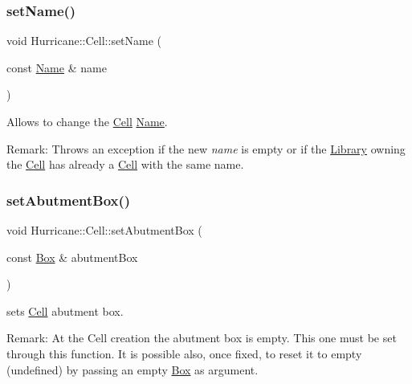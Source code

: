 \subsubsection{\texorpdfstring{set\+Name()}{setName()}}
{\footnotesize\ttfamily void Hurricane\+::\+Cell\+::set\+Name (\begin{DoxyParamCaption}\item[{const \mbox{\hyperlink{classHurricane_1_1Name}{Name}} \&}]{name }\end{DoxyParamCaption})}

Allows to change the \mbox{\hyperlink{classHurricane_1_1Cell}{Cell}} \mbox{\hyperlink{classHurricane_1_1Name}{Name}}.

\begin{DoxyParagraph}{Remark\+: Throws an exception if the new {\itshape name} is empty or if the}
\mbox{\hyperlink{classHurricane_1_1Library}{Library}} owning the \mbox{\hyperlink{classHurricane_1_1Cell}{Cell}} has already a \mbox{\hyperlink{classHurricane_1_1Cell}{Cell}} with the same name. 
\end{DoxyParagraph}
\mbox{\label{classHurricane_1_1Cell_ab1949e2b708f0bd2d215ab90cfe864e0}} 
\subsubsection{\texorpdfstring{set\+Abutment\+Box()}{setAbutmentBox()}}
{\footnotesize\ttfamily void Hurricane\+::\+Cell\+::set\+Abutment\+Box (\begin{DoxyParamCaption}\item[{const \mbox{\hyperlink{classHurricane_1_1Box}{Box}} \&}]{abutment\+Box }\end{DoxyParamCaption})}

sets \mbox{\hyperlink{classHurricane_1_1Cell}{Cell}} abutment box.

\begin{DoxyParagraph}{Remark\+: At the Cell creation the abutment box is empty. This one must}
be set through this function. It is possible also, once fixed, to reset it to empty (undefined) by passing an empty \mbox{\hyperlink{classHurricane_1_1Box}{Box}} as argument. 
\end{DoxyParagraph}
\mbox{\label{classHurricane_1_1Cell_a4591dc37153a835daa42b442221742cb}} 

